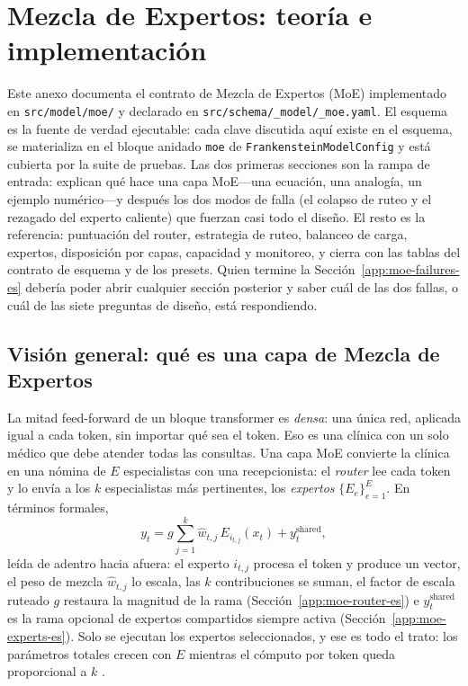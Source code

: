 \section{Mezcla de Expertos: teoría e implementación}
\label{app:moe}

Este anexo documenta el contrato de Mezcla de Expertos (MoE) implementado en
\texttt{src/model/moe/} y declarado en
\texttt{src/schema/\_model/\_moe.yaml}. El esquema es la fuente de verdad
ejecutable: cada clave discutida aquí existe en el esquema, se materializa en el
bloque anidado \texttt{moe} de \texttt{FrankensteinModelConfig} y está cubierta
por la suite de pruebas. Las dos primeras secciones son la rampa de entrada:
explican qué hace una capa MoE---una ecuación, una analogía, un ejemplo
numérico---y después los dos modos de falla (el colapso de ruteo y el rezagado
del experto caliente) que fuerzan casi todo el diseño. El resto es la
referencia: puntuación del router, estrategia de ruteo, balanceo de carga,
expertos, disposición por capas, capacidad y monitoreo, y cierra con las tablas
del contrato de esquema y de los presets. Quien termine la
Sección~\ref{app:moe-failures-es} debería poder abrir cualquier sección
posterior y saber cuál de las dos fallas, o cuál de las siete preguntas de
diseño, está respondiendo.

\subsection{Visión general: qué es una capa de Mezcla de Expertos}
\label{app:moe-overview-es}

La mitad feed-forward de un bloque transformer es \emph{densa}: una única red,
aplicada igual a cada token, sin importar qué sea el token. Eso es una clínica
con un solo médico que debe atender todas las consultas. Una capa MoE convierte
la clínica en una nómina de $E$ especialistas con una recepcionista: el
\emph{router} lee cada token y lo envía a los $k$ especialistas más pertinentes,
los \emph{expertos} $\{E_e\}_{e=1}^{E}$. En términos formales,
\begin{equation}
  y_t = g \sum_{j=1}^{k} \hat w_{t,j}\, E_{i_{t,j}}(x_t) + y^{\text{shared}}_t ,
  \label{eq:moe-layer-es}
\end{equation}
leída de adentro hacia afuera: el experto $i_{t,j}$ procesa el token y produce
un vector, el peso de mezcla $\hat w_{t,j}$ lo escala, las $k$ contribuciones se
suman, el factor de escala ruteado $g$ restaura la magnitud de la rama
(Sección~\ref{app:moe-router-es}) e $y^{\text{shared}}_t$ es la rama opcional
de expertos compartidos siempre activa (Sección~\ref{app:moe-experts-es}).
Solo se ejecutan los expertos seleccionados, y ese es todo el trato: los
parámetros totales crecen con $E$ mientras el cómputo por token queda
proporcional a $k$ \citep{shazeer2017moe,fedus2021switch}.

